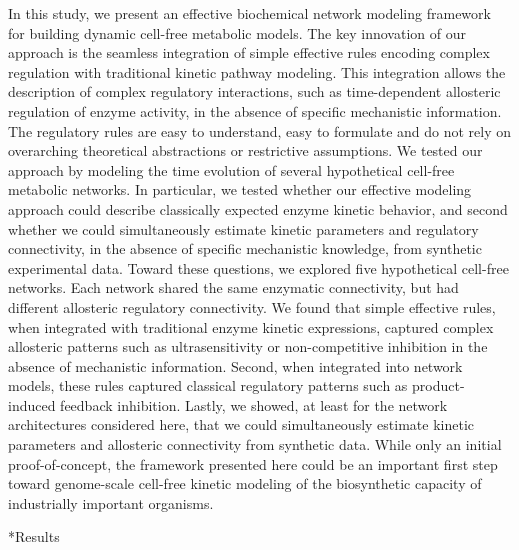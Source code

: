 \documentclass[12pt]{article}
\makeatletter
\renewcommand\section{\@startsection
	{subsection}{2}{0mm}
	{-0.2in}
	{0.05\baselineskip}
	{\normalfont\large\bfseries}}
\makeatother
\begin{document}
In this study, we present an effective biochemical network modeling framework for building dynamic cell-free metabolic models.
The key innovation of our approach is the seamless integration of simple effective rules encoding complex regulation with traditional kinetic pathway modeling. 
This integration allows the description of complex regulatory interactions, such as time-dependent allosteric regulation of enzyme activity, in the absence of specific mechanistic information. 
The regulatory rules are easy to understand, easy to formulate and do not rely on overarching theoretical abstractions or restrictive assumptions. 
We tested our approach by modeling the time evolution of several hypothetical cell-free metabolic networks. 
In particular, we tested whether our effective modeling approach could describe classically expected enzyme kinetic behavior, and second whether we could simultaneously estimate kinetic parameters and regulatory connectivity, in the absence of specific mechanistic knowledge, from synthetic experimental data. 
Toward these questions, we explored five hypothetical cell-free networks. 
Each network shared the same enzymatic connectivity, but had different allosteric regulatory connectivity. 
We found that simple effective rules, when integrated with traditional enzyme kinetic expressions, captured complex allosteric patterns such as ultrasensitivity or non-competitive inhibition in the absence of mechanistic information. 
Second, when integrated into network models, these rules captured classical regulatory patterns such as product-induced feedback inhibition. 
Lastly, we showed, at least for the network architectures considered here, that we could simultaneously estimate kinetic parameters and allosteric connectivity from synthetic data. 
While only an initial proof-of-concept, the framework presented here could be an important first step toward genome-scale cell-free kinetic modeling of the biosynthetic capacity of industrially important organisms.

\clearpage

\section*{Results}
\end{document}
